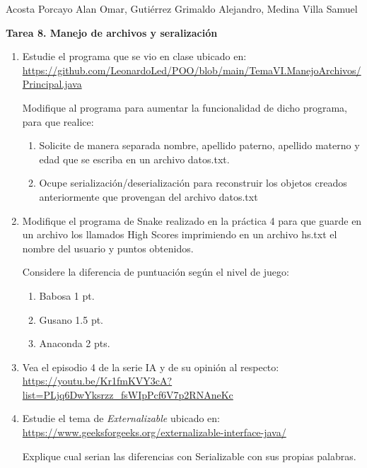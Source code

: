 \documentclass[12pt]{article}
\newcommand{\linejump}{\hfill \break}
\begin{document}
  \begin{center}
    Acosta Porcayo Alan Omar, Gutiérrez Grimaldo Alejandro, Medina Villa Samuel

    \linejump
    \LARGE \textbf{Tarea 8. Manejo de archivos y seralización}
  \end{center}
  
  \linejump
  \begin{enumerate}
    \item Estudie el programa que se vio en clase ubicado en: \url{https://github.com/LeonardoLed/POO/blob/main/TemaVI.ManejoArchivos/Principal.java}
    
    Modifique al programa para aumentar la funcionalidad de dicho programa, para que realice:
    \begin{enumerate}[label=\alph*)]
      \item Solicite de manera separada nombre, apellido paterno, apellido materno y edad que se escriba en un archivo datos.txt.
      \item Ocupe serialización/deserialización para reconstruir los objetos creados anteriormente que provengan del archivo datos.txt
    \end{enumerate}


    \item Modifique el programa de Snake realizado en la práctica 4 para que guarde en un archivo los llamados High Scores imprimiendo en un archivo hs.txt el nombre del usuario y puntos obtenidos.
    
    Considere la diferencia de puntuación según el nivel de juego:
    \begin{enumerate}[label=\alph*.]
      \item Babosa 1 pt.
      \item Gusano 1.5 pt.
      \item Anaconda 2 pts.
    \end{enumerate}

    
    \item Vea el episodio 4 de la serie IA y de su opinión al respecto: \url{https://youtu.be/Kr1fmKVY3cA?list=PLjq6DwYksrzz_fsWIpPcf6V7p2RNAneKc}
    

    \item Estudie el tema de \textit{Externalizable} ubicado en: \url{https://www.geeksforgeeks.org/externalizable-interface-java/}
    
    Explique cual serian las diferencias con Serializable con sus propias palabras.


  \end{enumerate}
\end{document}
